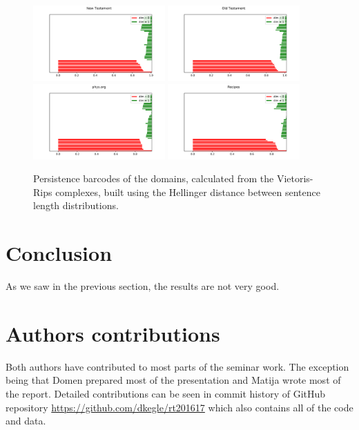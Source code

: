 \documentclass[12pt,a4paper]{amsart}
\begin{document}
\begin{figure}
  \centering
  \includegraphics[width=0.45\textwidth]{../plots/barcodes/bible-new-hell}
  \includegraphics[width=0.45\textwidth]{../plots/barcodes/bible-old-hell}
  \includegraphics[width=0.45\textwidth]{../plots/barcodes/phys-hell}
  \includegraphics[width=0.45\textwidth]{../plots/barcodes/recipes-hell}
  \caption{Persistence barcodes of the domains, calculated from the
    Vietoris-Rips complexes, built using the Hellinger distance between sentence
    length distributions.}
  \label{fig:barcode:hell}
\end{figure}

\section{Conclusion}

As we saw in the previous section, the results are not very good.

\section{Authors contributions}
Both authors have contributed to most parts of the seminar work. The exception
being that Domen prepared most of the presentation and Matija wrote most of the
report. Detailed contributions can be seen in commit history of GitHub
repository \url{https://github.com/dkegle/rt201617} which also contains all of
the code and data.




\end{document}
